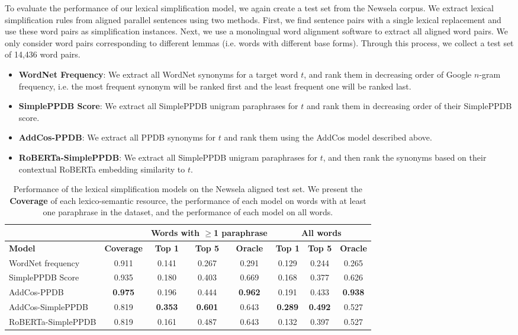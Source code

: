\documentclass[thesis.tex]{subfiles}
\begin{document}
To evaluate the performance of our lexical simplification model, we again create a test set from the Newsela corpus. We extract lexical simplification rules from aligned parallel sentences \citep{xu2015problems} using two methods. First, we find sentence pairs with a single lexical replacement and use these word pairs as simplification instances. Next, we use a monolingual word alignment software \citep{sultan1992back} to extract all aligned word pairs. We only consider word pairs corresponding to different lemmas (i.e. words with different base forms). Through this process, we collect a test set of 14,436 word pairs.

\begin{itemize}
\item \textbf{WordNet Frequency}: We extract all WordNet synonyms for a target word $t$, and rank them in decreasing order of Google $n$-gram frequency, i.e. the most frequent synonym will be ranked first and the least frequent one will be ranked last.
\item \textbf{SimplePPDB Score}: We extract all SimplePPDB unigram paraphrases for $t$ and rank them in decreasing order of their SimplePPDB score.
\item \textbf{AddCos-PPDB}: We extract all PPDB synonyms for $t$ and rank them using the AddCos model described above.
\item \textbf{RoBERTa-SimplePPDB}: We extract all SimplePPDB unigram paraphrases for $t$, and then rank the synonyms based on their contextual RoBERTa embedding similarity to $t$.
\end{itemize}

\begin{table*}
\begin{center}
	\footnotesize
    \begin{tabular}{|l||c|c|c|c||c|c|c|}
  	\hline
& & \multicolumn{3}{c||}{\textbf{Words with $\geq$1 paraphrase} }&  \multicolumn{3}{c|}{\textbf{All words}} \\ \hline   
\bf Model & \bf Coverage & \bf Top 1 & \bf Top 5 & \bf Oracle & \bf Top 1 & \bf Top 5 & \bf Oracle \\ \hline
WordNet frequency & 0.911 & 0.141 & 0.267 & 0.291 & 0.129 & 0.244 & 0.265 \\
SimplePPDB Score & 0.935 & 0.180 & 0.403 & 0.669 & 0.168 & 0.377 & 0.626 \\
AddCos-PPDB & \bf{0.975} & 0.196 & 0.444 & \bf{0.962} & 0.191 & 0.433 & \bf{0.938} \\
AddCos-SimplePPDB & 0.819 & \bf{0.353} & \bf{0.601} & 0.643 & \bf{0.289} & \bf{0.492} & 0.527 \\
RoBERTa-SimplePPDB & 0.819 & 0.161 & 0.487 & 0.643 & 0.132 & 0.397 & 0.527 \\ \hline
  \end{tabular}
   \caption{\label{tab:lexical_eval}Performance of the lexical simplification models on the Newsela aligned test set. We present the \textbf{Coverage} of each lexico-semantic resource, the performance of each model on words with at least one paraphrase in the dataset, and the performance of each model on all words.}
\end{center}
\end{table*}
\end{document}
